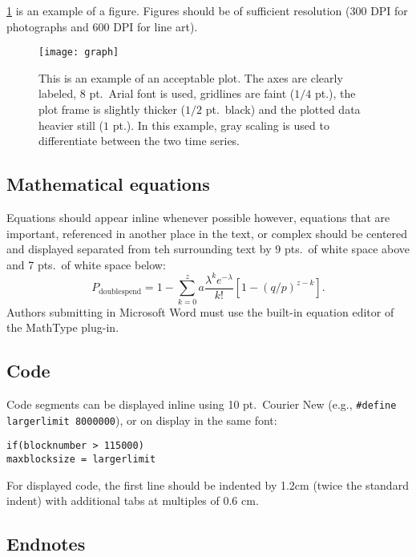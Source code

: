\documentclass{ledger}
\begin{document}
\cref{fig:1} is an example of a figure.  Figures should be of sufficient resolution (300 DPI for photographs and 600 DPI for line art).

\begin{figure}[ht]
\centering
\texttt{[image: graph]}
\caption{This is an example of an acceptable plot.  The axes are clearly labeled, 8 pt.\ Arial font is used, gridlines are faint ($1/4$ pt.), the plot frame is slightly thicker ($1/2$ pt.\ black) and the plotted data heavier still ($1$ pt.).  In this example, gray scaling is used to differentiate between the two time series.}
\label{fig:1}
\end{figure}

\subsection{Mathematical equations}

Equations should appear inline whenever possible however, equations that are important, referenced in another place in the text, or complex should be centered and displayed separated from teh surrounding text by 9 pts.\ of white space above and 7 pts.\ of white space below:
\begin{equation}
P_{\text{doublespend}}=1-\sum _{k=0}^za\frac{\lambda ^ke^{-\lambda}}{k!}\left[ 1-(q/p)^{z-k}\right] .
\end{equation}
Authors submitting in Microsoft Word must use the built-in equation editor of the MathType plug-in.

\subsection{Code}

Code segments can be displayed inline using 10 pt.~Courier New (e.g., \lstinline|#define largerlimit 8000000|), or on display in the same font:
\begin{lstlisting}
if(blocknumber > 115000)
maxblocksize = largerlimit
\end{lstlisting}
For displayed code, the first line should be indented by 1.2cm (twice the standard indent) with additional tabs at multiples of 0.6 cm.

\subsection{Endnotes}
\end{document}
